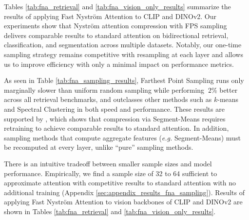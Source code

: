 Tables \ref{tab:fna_retrieval} and \ref{tab:fna_vision_only_results} summarize the results of applying Fast Nystr\"om Attention to CLIP and DINOv2. Our experiments show that Nystr\"om attention compression with FPS sampling delivers comparable results to standard attention on bidirectional retrieval, classification, and segmentation across multiple datasets. Notably, our one-time sampling strategy remains competitive with resampling at each layer and allows us to improve efficiency with only a minimal impact on performance metrics.

As seen in Table \ref{tab:fna_sampling_results}, Farthest Point Sampling runs only marginally slower than uniform random sampling while performing $~2\%$ better across all retrieval benchmarks, and outclasses other methods such as $k$-means and Spectral Clustering in both speed and performance. These results are supported by \cite{xiong2021nystromformer}, which shows that compression via Segment-Means requires retraining to achieve comparable results to standard attention. In addition, sampling methods that compute aggregate features (\textit{e.g.} Segment-Means) must be recomputed at every layer, unlike ``pure'' sampling methods.

There is an intuitive tradeoff between smaller sample sizes and model performance. Empirically, we find a sample size of 32 to 64 sufficient to approximate attention with competitive results to standard attention with no additional training (Appendix \ref{sec:appendix_results_fna_sampling}). Results of applying Fast Nystr\"om Attention to vision backbones of CLIP and DINOv2 are shown in Tables \ref{tab:fna_retrieval} and \ref{tab:fna_vision_only_results}. 


